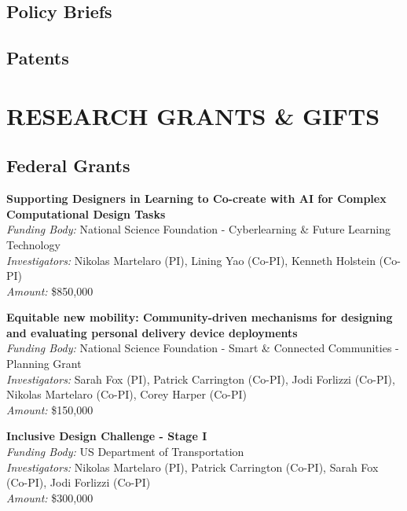 \documentclass[11pt]{article} %
\begin{document}
\subsection*{Policy Briefs}
\begin{refsection}
\nocite{*}
\printbibliography[heading=none]
\end{refsection}

\subsection*{Patents}
\begin{refsection}
\nocite{*}
\printbibliography[heading=none]
\end{refsection}

\newpage
\section*{RESEARCH GRANTS \& GIFTS}
\subsection*{Federal Grants}
\textbf{Supporting Designers in Learning to Co-create with AI for Complex Computational Design Tasks}\\
\textit{Funding Body:} National Science Foundation - Cyberlearning \& Future Learning Technology\\
\textit{Investigators:} Nikolas Martelaro (PI), Lining Yao (Co-PI), Kenneth Holstein (Co-PI)\\
\textit{Amount:} \$850,000
\medskip

\textbf{Equitable new mobility: Community-driven mechanisms for designing and evaluating personal delivery device deployments}\\
\textit{Funding Body:} National Science Foundation - Smart \& Connected Communities - Planning Grant\\
\textit{Investigators:} Sarah Fox (PI), Patrick  Carrington (Co-PI), Jodi Forlizzi (Co-PI), Nikolas Martelaro (Co-PI), Corey Harper (Co-PI)\\
\textit{Amount:} \$150,000
\medskip

 \textbf{Inclusive Design Challenge - Stage I}\\
\textit{Funding Body:} US Department of Transportation\\
\textit{Investigators:} Nikolas Martelaro (PI), Patrick Carrington (Co-PI), Sarah Fox (Co-PI), Jodi Forlizzi (Co-PI)\\
\textit{Amount:} \$300,000
\end{document}
